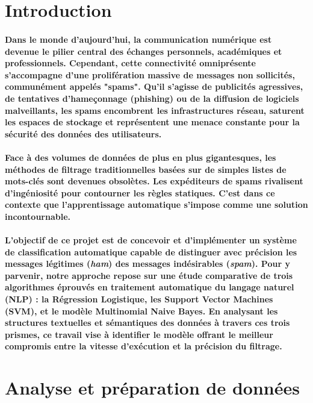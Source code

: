 \documentclass[a4paper,12pt]{article}
\begin{document}
\section*{Introduction}
\vspace*{0.2cm}
\paragraph{Dans le monde d'aujourd'hui, la communication numérique est devenue le pilier central des échanges personnels, académiques et professionnels. Cependant, cette connectivité omniprésente s'accompagne d'une prolifération massive de messages non sollicités, communément appelés "spams". Qu'il s'agisse de publicités agressives, de tentatives d'hameçonnage (phishing) ou de la diffusion de logiciels malveillants, les spams encombrent les infrastructures réseau, saturent les espaces de stockage et représentent une menace constante pour la sécurité des données des utilisateurs.}

\paragraph{Face à des volumes de données de plus en plus gigantesques, les méthodes de filtrage traditionnelles basées sur de simples listes de mots-clés sont devenues obsolètes. Les expéditeurs de spams rivalisent d'ingéniosité pour contourner les règles statiques. C'est dans ce contexte que l'apprentissage automatique s'impose comme une solution incontournable.}

\paragraph{L'objectif de ce projet est de concevoir et d'implémenter un système de classification automatique capable de distinguer avec précision les messages légitimes (\textit{ham}) des messages indésirables (\textit{spam}). Pour y parvenir, notre approche repose sur une étude comparative de trois algorithmes éprouvés en traitement automatique du langage naturel (NLP) : la \textbf{Régression Logistique}, les \textbf{Support Vector Machines (SVM)}, et le modèle \textbf{Multinomial Naive Bayes}. En analysant les structures textuelles et sémantiques des données à travers ces trois prismes, ce travail vise à identifier le modèle offrant le meilleur compromis entre la vitesse d'exécution et la précision du filtrage.
}

\newpage
\section{Analyse et préparation de données}
\end{document}
